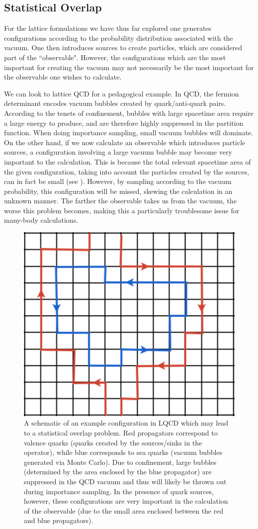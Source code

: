 \subsection{\label{sec:overlap}Statistical Overlap}

For the lattice formulations we have thus far explored one generates configurations according to the probability distribution associated with the vacuum. One then introduces sources to create particles, which are considered part of the ``observable". However, the configurations which are the most important for creating the vacuum may not necessarily be the most important for the observable one wishes to calculate. 

We can look to lattice QCD for a pedagogical example. In QCD, the fermion determinant encodes vacuum bubbles created by quark/anti-quark pairs. According to the tenets of confinement, bubbles with large spacetime area require a large energy to produce, and are therefore highly suppressed in the partition function. When doing importance sampling, small vacuum bubbles will dominate. On the other hand, if we now calculate an observable which introduces particle sources, a configuration involving a large vacuum bubble may become very important to the calculation. This is because the total relevant spacetime area of the given configuration, taking into account the particles created by the sources, can in fact be small (see ). However, by sampling according to the vacuum probability, this configuration will be missed, skewing the calculation in an unknown manner. The farther the observable takes us from the vacuum, the worse this problem becomes, making this a particularly troublesome issue for many-body calculations.

\begin{figure}
\begin{center}
\includegraphics[width=0.3\linewidth]{Chapter5-figures/QCDbubble.pdf}
\end{center}
\caption{\label{fig:QCDbubble}A schematic of an example configuration in LQCD which may lead to a statistical overlap problem. Red propagators correspond to valence quarks (quarks created by the sources/sinks in the operator), while blue corresponds to sea quarks (vacuum bubbles generated via Monte Carlo). Due to confinement, large bubbles (determined by the area enclosed by the blue propagator) are suppressed in the QCD vacuum and thus will likely be thrown out during importance sampling. In the presence of quark sources, however, these configurations are very important in the calculation of the observable (due to the small area enclosed between the red and blue propagators).}
\end{figure}

